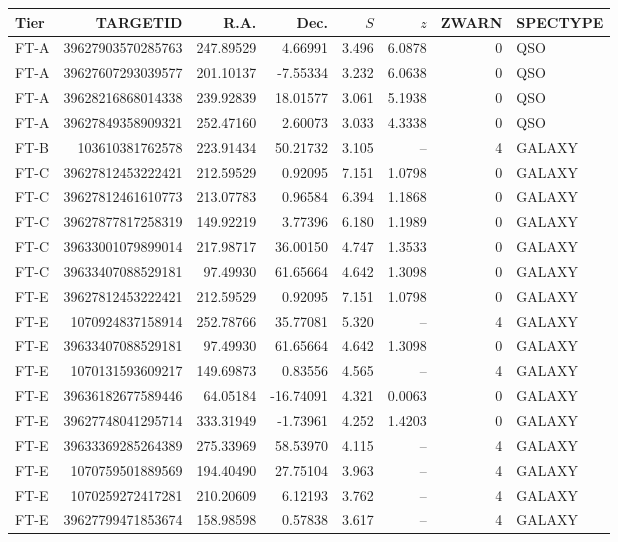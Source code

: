 \begin{ruledtabular}
\begin{tabular}{l r r r r r r l}
Tier & TARGETID & R.A. & Dec. & $S$ & $z$ & ZWARN & SPECTYPE \\
\hline
FT-A & 39627903570285763 & 247.89529 & 4.66991 & 3.496 & 6.0878 & 0 & QSO \\
FT-A & 39627607293039577 & 201.10137 & -7.55334 & 3.232 & 6.0638 & 0 & QSO \\
FT-A & 39628216868014338 & 239.92839 & 18.01577 & 3.061 & 5.1938 & 0 & QSO \\
FT-A & 39627849358909321 & 252.47160 & 2.60073 & 3.033 & 4.3338 & 0 & QSO \\
FT-B & 103610381762578 & 223.91434 & 50.21732 & 3.105 & -- & 4 & GALAXY \\
FT-C & 39627812453222421 & 212.59529 & 0.92095 & 7.151 & 1.0798 & 0 & GALAXY \\
FT-C & 39627812461610773 & 213.07783 & 0.96584 & 6.394 & 1.1868 & 0 & GALAXY \\
FT-C & 39627877817258319 & 149.92219 & 3.77396 & 6.180 & 1.1989 & 0 & GALAXY \\
FT-C & 39633001079899014 & 217.98717 & 36.00150 & 4.747 & 1.3533 & 0 & GALAXY \\
FT-C & 39633407088529181 & 97.49930 & 61.65664 & 4.642 & 1.3098 & 0 & GALAXY \\
FT-E & 39627812453222421 & 212.59529 & 0.92095 & 7.151 & 1.0798 & 0 & GALAXY \\
FT-E & 1070924837158914 & 252.78766 & 35.77081 & 5.320 & -- & 4 & GALAXY \\
FT-E & 39633407088529181 & 97.49930 & 61.65664 & 4.642 & 1.3098 & 0 & GALAXY \\
FT-E & 1070131593609217 & 149.69873 & 0.83556 & 4.565 & -- & 4 & GALAXY \\
FT-E & 39636182677589446 & 64.05184 & -16.74091 & 4.321 & 0.0063 & 0 & GALAXY \\
FT-E & 39627748041295714 & 333.31949 & -1.73961 & 4.252 & 1.4203 & 0 & GALAXY \\
FT-E & 39633369285264389 & 275.33969 & 58.53970 & 4.115 & -- & 4 & GALAXY \\
FT-E & 1070759501889569 & 194.40490 & 27.75104 & 3.963 & -- & 4 & GALAXY \\
FT-E & 1070259272417281 & 210.20609 & 6.12193 & 3.762 & -- & 4 & GALAXY \\
FT-E & 39627799471853674 & 158.98598 & 0.57838 & 3.617 & -- & 4 & GALAXY \\

\end{tabular}
\end{ruledtabular}
